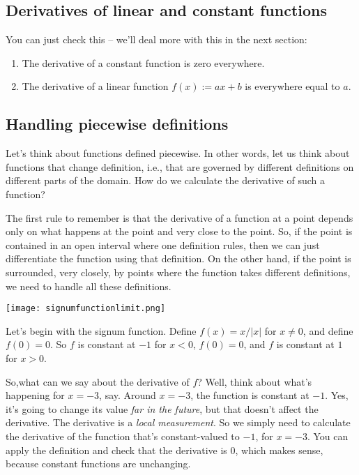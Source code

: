 \documentclass[10pt]{amsart}
\begin{document}
\subsection{Derivatives of linear and constant functions}

You can just check this -- we'll deal more with this in the next
section:

\begin{enumerate}
\item The derivative of a constant function is zero everywhere.
\item The derivative of a linear function $f(x) := ax + b$ is
  everywhere equal to $a$.
\end{enumerate}

\subsection{Handling piecewise definitions}

Let's think about functions defined piecewise. In other words, let us
think about functions that change definition, i.e., that are governed
by different definitions on different parts of the domain. How do we
calculate the derivative of such a function?

The first rule to remember is that the derivative of a function at a
point depends only on what happens at the point and very close to the
point. So, if the point is contained in an open interval where one
definition rules, then we can just differentiate the function using
that definition. On the other hand, if the point is surrounded, very
closely, by points where the function takes different definitions, we
need to handle all these definitions.

\texttt{[image: signumfunctionlimit.png]}

Let's begin with the signum function. Define $f(x) = x/|x|$ for $x \ne
0$, and define $f(0) = 0$. So $f$ is constant at $-1$ for $x < 0$,
$f(0) = 0$, and $f$ is constant at $1$ for $x > 0$.

So,what can we say about the derivative of $f$? Well, think about
what's happening for $x = -3$, say. Around $x = -3$, the function is
constant at $-1$. Yes, it's going to change its value {\em far in the
future}, but that doesn't affect the derivative. The derivative is a
{\em local measurement}. So we simply need to calculate the derivative
of the function that's constant-valued to $-1$, for $x = -3$. You can
apply the definition and check that the derivative is $0$, which makes
sense, because constant functions are unchanging.
\end{document}
